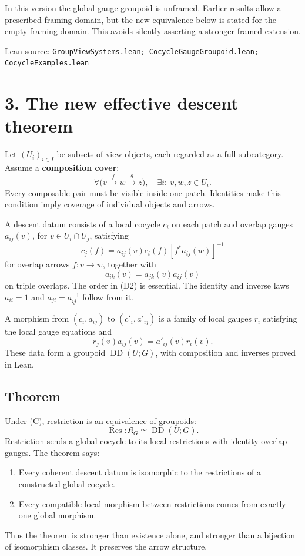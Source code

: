 \documentclass[11pt]{article}
\newcommand{\K}{\mathfrak K}
\newcommand{\DD}{\operatorname{DD}}
\newcommand{\Res}{\operatorname{Res}}
\newcommand{\source}[1]{\par{\footnotesize\textsf{Lean source:} \texttt{#1}}\par}
\begin{document}
In this version the global gauge groupoid is unframed. Earlier results allow a prescribed framing domain, but the new equivalence below is stated for the empty framing domain. This avoids silently asserting a stronger framed extension.
\source{GroupViewSystems.lean; CocycleGaugeGroupoid.lean; CocycleExamples.lean}

\clearpage
\section*{3. The new effective descent theorem}
Let $(U_i)_{i\in I}$ be subsets of view objects, each regarded as a full subcategory. Assume a \textbf{composition cover}:
\[
\boxed{\forall\bigl(v\xrightarrow f w\xrightarrow g z\bigr),\quad
\exists i:\ v,w,z\in U_i.}
\tag{C}
\]
Every composable pair must be visible inside one patch. Identities make this condition imply coverage of individual objects and arrows.

A descent datum consists of a local cocycle $c_i$ on each patch and overlap gauges $a_{ij}(v)$, for $v\in U_i\cap U_j$, satisfying
\[
\boxed{c_j(f)=a_{ij}(v)c_i(f)[f^*a_{ij}(w)]^{-1}}
\tag{D1}
\]
for overlap arrows $f:v\to w$, together with
\[
\boxed{a_{ik}(v)=a_{jk}(v)a_{ij}(v)}
\tag{D2}
\]
on triple overlaps. The order in (D2) is essential. The identity and inverse laws $a_{ii}=1$ and $a_{ji}=a_{ij}^{-1}$ follow from it.

A morphism from $(c_i,a_{ij})$ to $(c'_i,a'_{ij})$ is a family of local gauges $r_i$ satisfying the local gauge equations and
\[
r_j(v)a_{ij}(v)=a'_{ij}(v)r_i(v).
\]
These data form a groupoid $\DD(U;G)$, with composition and inverses proved in Lean.

\subsection*{Theorem}
Under (C), restriction is an equivalence of groupoids:
\[
\boxed{\Res:\K_G\simeq\DD(U;G).}
\]
Restriction sends a global cocycle to its local restrictions with identity overlap gauges. The theorem says:

\begin{enumerate}
\item Every coherent descent datum is isomorphic to the restrictions of a constructed global cocycle.
\item Every compatible local morphism between restrictions comes from exactly one global morphism.
\end{enumerate}
Thus the theorem is stronger than existence alone, and stronger than a bijection of isomorphism classes. It preserves the arrow structure.
\end{document}

